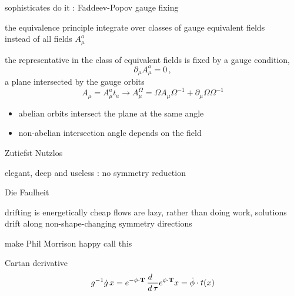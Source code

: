 \begin{frame}{sophisticates do it : Faddeev-Popov gauge fixing}
\begin{block}{the equivalence principle}
integrate over classes of gauge equivalent fields
\\
instead of all fields $A_\mu^a$
\end{block}

the representative in the class of equivalent fields is
fixed by a gauge condition,
\[
    \partial_{\mu} A_{\mu}^{a} = 0
    \,,
\]
a plane intersected by the gauge orbits
\[
    A_{\mu} = A_{\mu}^{a}t_{a} \to A_{\mu}^{\Omega}
            = \Omega A_{\mu} \Omega^{-1} + \partial_{\mu} \Omega \Omega^{-1}
\]
\begin{itemize}
  \item abelian orbits intersect the plane at the same angle
  \item non-abelian intersection angle depends on the field
\end{itemize}
\end{frame}

\begin{frame}{\Large Zutiefst Nutzlos}
\begin{block}{}
    {\large
elegant, deep and useless : no symmetry reduction
    }
\end{block}
\end{frame}

\begin{frame}{\Large Die Faulheit}
\begin{block}{drifting is energetically cheap}
flows are lazy, rather than doing work, solutions drift along non-shape-changing
symmetry directions
\end{block}
\end{frame}

\begin{frame}{make Phil Morrison happy}
call this

\begin{block}{Cartan derivative}
\[
g^{-1}\dot{g} \,x
    =e^{-{\bf \phi} \cdot \mathbf{T}} \,
\frac{d ~~}{d \, \tau} e^{{\bf \phi} \cdot \mathbf{T}}x
    =\dot{{\bf \phi}}\cdot t(x)
\]
\end{block}
\end{frame}


